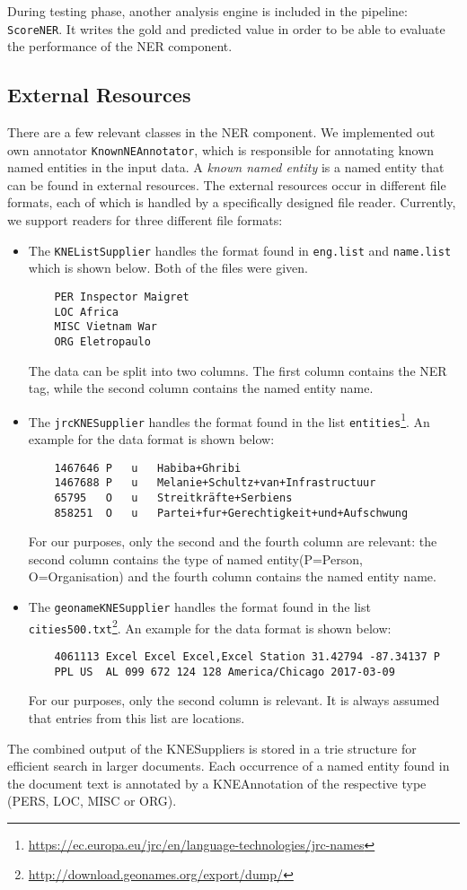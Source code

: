 \documentclass{article}
\begin{document}
During testing phase, another analysis engine is included in the pipeline: \texttt{ScoreNER}.
It writes the gold and predicted value in order to be able to evaluate the performance of the NER component.

\subsection{External Resources}

There are a few relevant classes in the NER component.
We implemented out own annotator \texttt{KnownNEAnnotator}, which is responsible for annotating known named entities in the input data.
A \emph{known named entity} is a named entity that can be found in external resources.
The external resources occur in different file formats, each of which is handled by a specifically designed file reader. Currently, we support readers for three different file formats:
\begin{itemize}
	\item The \texttt{KNEListSupplier} handles the format found in \texttt{eng.list} and \texttt{name.list} which is shown below.
	Both of the files were given.
	\begin{verbatim}
	PER Inspector Maigret
	LOC Africa
	MISC Vietnam War
	ORG Eletropaulo
	\end{verbatim}
	The data can be split into two columns.
	The first column contains the NER tag, while the second column contains the named entity name.
	\item The \texttt{jrcKNESupplier} handles the format found in the list \texttt{entities}\footnote{\url{https://ec.europa.eu/jrc/en/language-technologies/jrc-names}}.
	An example for the data format is shown below:
	\begin{verbatim}
	1467646	P	u	Habiba+Ghribi
	1467688	P	u	Melanie+Schultz+van+Infrastructuur
	65795	O	u	Streitkräfte+Serbiens
	858251	O	u	Partei+fur+Gerechtigkeit+und+Aufschwung
	\end{verbatim}
	For our purposes, only the second and the fourth column are relevant: the second column contains the type of named entity(P=Person, O=Organisation) and the fourth column contains the named entity name.
	\item The \texttt{geonameKNESupplier} handles the format found in the list \texttt{cities500.txt}\footnote{\url{http://download.geonames.org/export/dump/}}.
	An example for the data format is shown below:
	\begin{verbatim}
	4061113	Excel Excel	Excel,Excel Station	31.42794 -87.34137 P
	PPL US	AL 099 672 124 128 America/Chicago 2017-03-09
	\end{verbatim}
	For our purposes, only the second column is relevant.
	It is always assumed that entries from this list are locations.
\end{itemize}
The combined output of the KNESuppliers is stored in a trie structure for efficient search in larger documents.
Each occurrence of a named entity found in the document text is annotated by a KNEAnnotation of the respective type (PERS, LOC, MISC or ORG).
\end{document}
